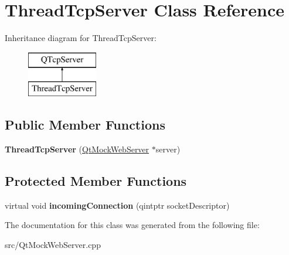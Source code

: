 \hypertarget{class_thread_tcp_server}{\section{Thread\+Tcp\+Server Class Reference}
\label{class_thread_tcp_server}
}
Inheritance diagram for Thread\+Tcp\+Server\+:\begin{figure}[H]
\begin{center}
\leavevmode
\includegraphics[height=2.000000cm]{class_thread_tcp_server}
\end{center}
\end{figure}
\subsection*{Public Member Functions}
\begin{DoxyCompactItemize}
\item 
\hypertarget{class_thread_tcp_server_a838d5318b88564e25e974664307edaa0}{{\bfseries Thread\+Tcp\+Server} (\hyperlink{class_qt_mock_web_server}{Qt\+Mock\+Web\+Server} $\ast$server)}\label{class_thread_tcp_server_a838d5318b88564e25e974664307edaa0}

\end{DoxyCompactItemize}
\subsection*{Protected Member Functions}
\begin{DoxyCompactItemize}
\item 
\hypertarget{class_thread_tcp_server_ac3d686b6b99c073016a9e9e9cc947e50}{virtual void {\bfseries incoming\+Connection} (qintptr socket\+Descriptor)}\label{class_thread_tcp_server_ac3d686b6b99c073016a9e9e9cc947e50}

\end{DoxyCompactItemize}


The documentation for this class was generated from the following file\+:\begin{DoxyCompactItemize}
\item 
src/Qt\+Mock\+Web\+Server.\+cpp\end{DoxyCompactItemize}
